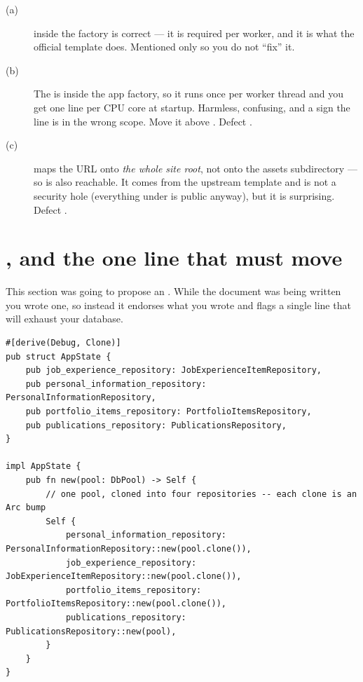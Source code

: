 \begin{description}
  \item[(a)]  inside the factory is correct --- it is required
    per worker, and it is what the official template does. Mentioned only so you do not ``fix'' it.
  \item[(b)] The  is inside the app factory, so it runs once per worker thread and
    you get one line per CPU core at startup. Harmless, confusing, and a sign the line is in the
    wrong scope. Move it above . Defect .
  \item[(c)]  maps the URL  onto
    \emph{the whole site root}, not onto the assets subdirectory --- so
     is also reachable. It comes from the upstream template and
    is not a security hole (everything under  is public anyway), but it is
    surprising. Defect .
\end{description}

\section{, and the one line that must move}
\label{sec:appstate}

This section was going to propose an . While the document was being written you
wrote one, so instead it endorses what you wrote and flags a single line that will exhaust your
database.

\begin{verified}
\begin{lstlisting}[style=rs,caption={\file{src/entrypoint/application\_state.rs}, as written.}]
#[derive(Debug, Clone)]
pub struct AppState {
    pub job_experience_repository: JobExperienceItemRepository,
    pub personal_information_repository: PersonalInformationRepository,
    pub portfolio_items_repository: PortfolioItemsRepository,
    pub publications_repository: PublicationsRepository,
}

impl AppState {
    pub fn new(pool: DbPool) -> Self {
        // one pool, cloned into four repositories -- each clone is an Arc bump
        Self {
            personal_information_repository: PersonalInformationRepository::new(pool.clone()),
            job_experience_repository: JobExperienceItemRepository::new(pool.clone()),
            portfolio_items_repository: PortfolioItemsRepository::new(pool.clone()),
            publications_repository: PublicationsRepository::new(pool),
        }
    }
}
\end{lstlisting}
\end{verified}

